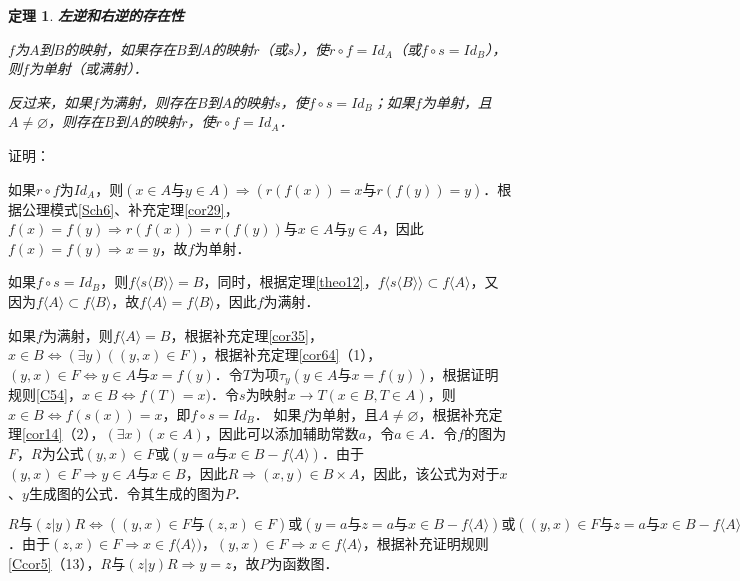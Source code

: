 \documentclass[12pt, a4paper, oneside]{book}
\newtheorem{theo}{定理}
\begin{document}
			\begin{theo}\label{theo19}
				\textbf{左逆和右逆的存在性}
				\par
				$f$为$A$到$B$的映射，如果存在$B$到$A$的映射$r$（或$s$），使$r\circ f=Id_A$（或$f\circ s=Id_B$），则$f$为单射（或满射）．
				\par
				反过来，如果$f$为满射，则存在$B$到$A$的映射$s$，使$f\circ s=Id_B$；如果$f$为单射，且$A\neq \varnothing$，则存在$B$到$A$的映射$r$，使$r\circ f=Id_A$．
			\end{theo}
			证明：
			\par
			如果$r\circ f$为$Id_A$，则$(x\in A\text{与}y\in A)\Rightarrow (r(f(x))=x\text{与}r(f(y))=y)$．根据公理模式\ref{Sch6}、补充定理\ref{cor29}， $f(x)=f(y)\Rightarrow r(f(x))=r(f(y))\text{与}x\in A\text{与}y\in A$，因此$f(x)=f(y)\Rightarrow x=y$，故$f$为单射．
			\par
			如果$f\circ s=Id_B$，则$f\langle s\langle B \rangle \rangle=B$，同时，根据定理\ref{theo12}，$f\langle s\langle B \rangle \rangle\subset f\langle A \rangle $，又因为$f\langle A \rangle \subset f\langle B \rangle $，故$f\langle A \rangle =f\langle B \rangle $，因此$f$为满射．
			\par
			如果$f$为满射，则$f\langle A \rangle =B$，根据补充定理\ref{cor35}，$x\in B\Leftrightarrow (\exists y)((y, x)\in F)$，根据补充定理\ref{cor64}（1），$(y, x)\in F\Leftrightarrow y\in A\text{与}x=f(y)$．令$T$为项$\tau_y(y\in A\text{与}x=f(y))$，根据证明规则\ref{C54}，$x\in B\Leftrightarrow f(T)=x)$．令$s$为映射$x\to T(x\in B, T\in A)$，则$x\in B\Leftrightarrow f(s(x))=x$，即$f\circ s=Id_B$．
			如果$f$为单射，且$A\neq \varnothing$，根据补充定理\ref{cor14}（2），$(\exists x)(x\in A)$，因此可以添加辅助常数$a$，令$a\in A$．令$f$的图为$F$，$R$为公式$(y, x)\in F\text{或}(y=a\text{与}x\in B-f\langle A \rangle )$．由于$(y, x)\in F\Rightarrow y\in A\text{与}x\in B$，因此$R\Rightarrow (x, y)\in B\times A$，因此，该公式为对于$x$、$y$生成图的公式．令其生成的图为$P$．
			\par
			$R\text{与}(z|y)R\Leftrightarrow ((y, x)\in F\text{与}(z, x)\in F)\text{或}(y=a\text{与}z=a\text{与}x\in B-f\langle A \rangle )\text{或}((y, x)\in F \text{与}z=a\text{与}x\in B-f\langle A \rangle )\text{或}((z, x)\in F \text{与}y=a\text{与}x\in B\text{与}x\notin f\langle A \rangle )$．$由于(z, x)\in F\Rightarrow x\in f\langle A \rangle )$，$(y, x)\in F\Rightarrow x\in f\langle A \rangle $，根据补充证明规则\ref{Ccor5}（13），$R\text{与}(z|y) R\Rightarrow y=z$，故$P$为函数图．
			\par
\end{document}
